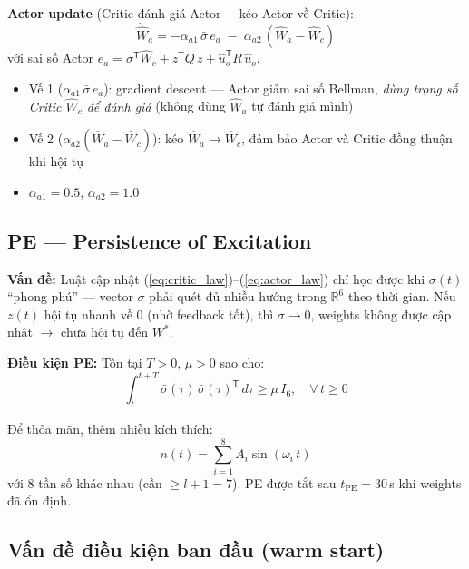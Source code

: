 \documentclass[12pt,a4paper]{article}
\newcommand{\R}{\mathbb{R}}
\newcommand{\T}{\mathsf{T}}
\begin{document}
\textbf{Actor update} (Critic đánh giá Actor + kéo Actor về Critic):
\begin{equation}\label{eq:actor_law}
    \dot{\hat{W}}_a = -\alpha_{a1}\, \bar{\sigma}\, e_a \;-\; \alpha_{a2}\,(\hat{W}_a - \hat{W}_c)
\end{equation}
với sai số Actor $e_a = \sigma^\T \hat{W}_c + z^\T Q\, z + \hat{u}_o^\T R\, \hat{u}_o$.

\begin{itemize}[nosep]
    \item Vế 1 ($\alpha_{a1}\,\bar{\sigma}\,e_a$): gradient descent --- Actor giảm sai số Bellman, \textit{dùng trọng số Critic $\hat{W}_c$ để đánh giá} (không dùng $\hat{W}_a$ tự đánh giá mình)
    \item Vế 2 ($\alpha_{a2}(\hat{W}_a - \hat{W}_c)$): kéo $\hat{W}_a \to \hat{W}_c$, đảm bảo Actor và Critic đồng thuận khi hội tụ
    \item $\alpha_{a1} = 0.5$, $\alpha_{a2} = 1.0$
\end{itemize}

\subsection{PE --- Persistence of Excitation}

\textbf{Vấn đề:} Luật cập nhật (\ref{eq:critic_law})--(\ref{eq:actor_law}) chỉ học được khi $\sigma(t)$ ``phong phú'' --- vector $\sigma$ phải quét đủ nhiều hướng trong $\R^6$ theo thời gian. Nếu $z(t)$ hội tụ nhanh về 0 (nhờ feedback tốt), thì $\sigma \to 0$, weights không được cập nhật $\to$ chưa hội tụ đến $W^*$.

\textbf{Điều kiện PE:} Tồn tại $T > 0$, $\mu > 0$ sao cho:
\begin{equation}
    \int_t^{t+T} \bar{\sigma}(\tau)\,\bar{\sigma}(\tau)^\T\, d\tau \geq \mu\, I_6, \quad \forall\, t \geq 0
\end{equation}

Để thỏa mãn, thêm nhiễu kích thích:
\begin{equation}
    n(t) = \sum_{i=1}^{8} A_i \sin(\omega_i\, t)
\end{equation}
với 8 tần số khác nhau (cần $\geq l + 1 = 7$). PE được tắt sau $t_\text{PE} = 30$\,s khi weights đã ổn định.

\subsection{Vấn đề điều kiện ban đầu (warm start)}
\end{document}
